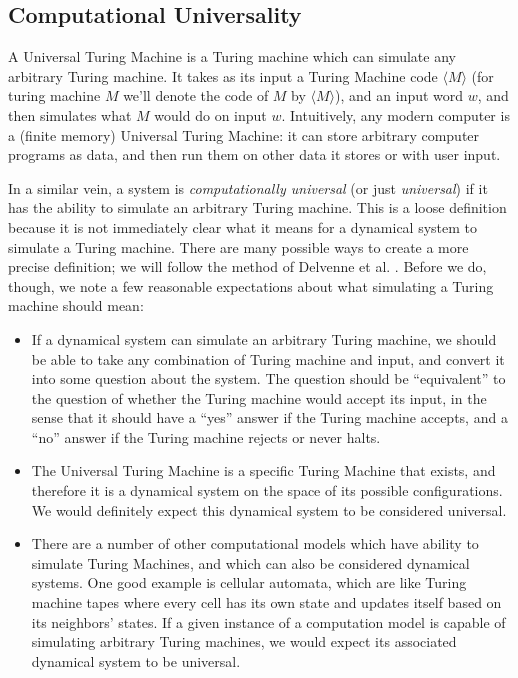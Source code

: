 \documentclass{fkpaper}
\begin{document}
\begin{multicols}{2}
\section{Computational Universality}

A Universal Turing Machine is a Turing machine which can simulate any
arbitrary Turing machine. It takes as its input a Turing Machine code $\langle M \rangle$ (for turing machine $M$ we'll denote the code of $M$ by $\langle M \rangle$), and an input word $w$, and then simulates what $M$ would do on input $w$. Intuitively, any modern computer is a (finite memory) Universal Turing Machine: it can store arbitrary computer programs as data, and then run them on other data it stores or with user input.

In a similar vein, a system is {\it computationally universal} (or
just {\it universal}) if it has the ability to simulate an arbitrary
Turing machine. This is a loose definition because it is not
immediately clear what it means for a dynamical system to simulate a
Turing machine. There are many possible ways to create a more precise
definition; we will follow the method of Delvenne et al. \cite{Delvenne2004Apr}.
Before we do, though, we note a few reasonable expectations about what
simulating a Turing machine should mean:

\begin{itemize}
  \item If a dynamical system can simulate an arbitrary Turing machine, we should be able to take any combination of Turing machine and input, and convert it into some question about the system. The question should be ``equivalent'' to the question of whether the Turing machine would accept its input, in the sense that it should have a ``yes'' answer if the Turing machine accepts, and a ``no'' answer if the Turing machine rejects or never halts.

  \item The Universal Turing Machine is a specific Turing Machine that exists, and therefore it is a dynamical system on the space of its possible configurations. We would definitely expect this dynamical system to be considered universal.

  \item There are a number of other computational models which have ability to simulate Turing Machines, and which can also be considered dynamical systems. One good example is cellular automata, which are like Turing machine tapes where every cell has its own state and updates itself based on its neighbors' states. If a given instance of a computation model is capable of simulating arbitrary Turing machines, we would expect its associated dynamical system to be universal.


\end{itemize}
\end{multicols}
\end{document}
